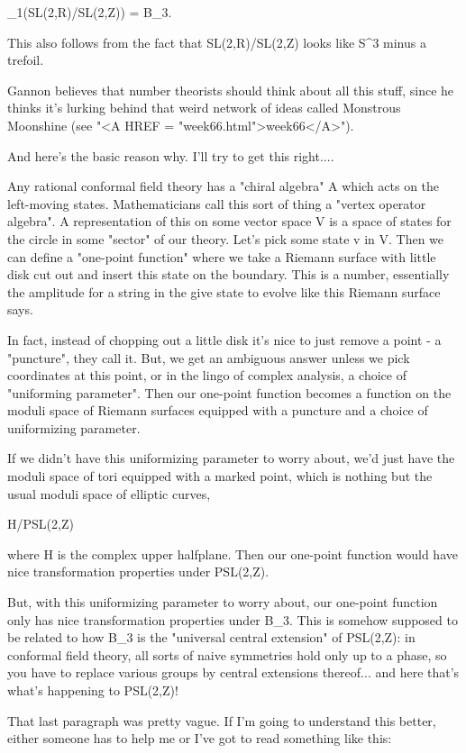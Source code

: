 \pi _{1}(SL(2,R)/SL(2,Z)) = B_{3}.

This also follows from the fact that 
SL(2,R)/SL(2,Z) looks like S^{3} minus a trefoil.

Gannon believes that number theorists should think about all this stuff,
since he thinks it's lurking behind that weird network of ideas called
Monstrous Moonshine (see "<A HREF = "week66.html">week66</A>").

And here's the basic reason why.  I'll try to get this right....

Any rational conformal field theory has a "chiral algebra" A which 
acts
on the left-moving states.  Mathematicians call this sort of thing a
"vertex operator algebra".  A representation of this on some vector
space V is a space of states for the circle in some "sector" of our
theory.  Let's pick some state v in V.   Then we can define a 
"one-point function" where we take a Riemann surface with little 
disk cut out and insert this state on the boundary.  This is a number,
essentially the amplitude for a string in the give state to evolve like 
this Riemann surface says. 

In fact, instead of chopping out a little disk it's nice to just
remove a point - a "puncture", they call it.  But, we get an ambiguous
answer unless we pick coordinates at this point, or in the lingo of
complex analysis, a choice of "uniforming parameter".  Then our
one-point function becomes a function on the moduli space of Riemann
surfaces equipped with a puncture and a choice of uniformizing parameter.

If we didn't have this uniformizing parameter to worry about, we'd
just have the moduli space of tori equipped with a marked point, 
which is nothing but the usual moduli space of elliptic curves,

H/PSL(2,Z)

where H is the complex upper halfplane.  Then our one-point function
would have nice transformation properties under PSL(2,Z).  

But, with this uniformizing parameter to worry about, our one-point 
function only has nice transformation properties under B_{3}.  This 
is somehow supposed to be related to how B_{3} is the "universal
central extension" of PSL(2,Z): in conformal field theory, all sorts
of naive symmetries hold only up to a phase, so you have to replace
various groups by central extensions thereof... and here that's what's 
happening to PSL(2,Z)!

That last paragraph was pretty vague.  If I'm going to understand this
better, either someone has to help me or I've got to read something
like this:

